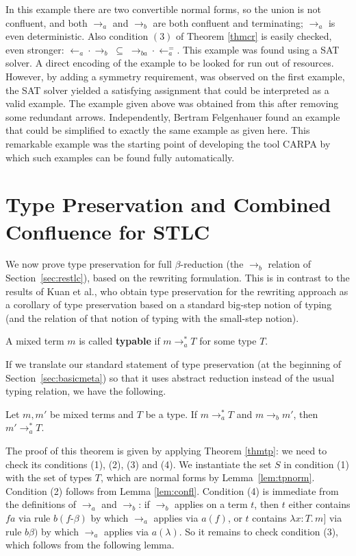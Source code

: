 \documentclass{LMCS}
\newcommand{\subse}{\; \subseteq \;}
\begin{document}
\vspace{4mm}

In this example there are two convertible normal forms, so the union is
not confluent, and both $\to_a$ and $\to_b$ are both confluent and terminating;
$\to_a$ is even deterministic. Also condition $(3)$ of Theorem
\ref{thmcr} is easily checked, even stronger:
$\leftarrow_a \cdot \to_b \subse \to_{ba} \cdot \leftarrow_a^=$.
This example was found using a SAT solver. A direct encoding of the example to be
looked for run out of resources. However, by adding a symmetry requirement, 
was observed on the first example, the SAT solver yielded a satisfying assignment
that could be interpreted as a valid example. The example given
above was obtained from this after removing some redundant arrows.
Independently, Bertram Felgenhauer found an example that could be
simplified to exactly the same example as given here. This remarkable
example was the starting point of developing the tool CARPA by which such
examples can be found fully automatically.

\section{Type Preservation and Combined Confluence for STLC}
\label{sec:presstlc}

We now prove type preservation for full $\beta$-reduction (the $\to_b$
relation of Section~\ref{sec:restlc}), based on the rewriting
formulation.  This is in contrast to the results of Kuan et al., who
obtain type preservation for the rewriting approach as a corollary of
type preservation based on a standard big-step notion of typing (and
the relation of that notion of typing with the small-step notion).  

\begin{defi}[Typability]
A mixed term $m$ is called \textbf{typable} 
if $m\to_a^* T$ for some type $T$.  
\end{defi}

\noindent If we translate our standard statement of type preservation (at the
beginning of Section~\ref{sec:basicmeta}) so that it uses abstract
reduction instead of the usual typing relation, we have the following.

\begin{thm}
\label{thm:presstlc}
Let $m,m'$ be mixed terms and $T$ be a type.
If $m \to_a^* T$ and $m\to_b m'$, then $m'\to_a^* T$.
\end{thm}

\noindent The proof of this theorem is given by applying Theorem
\ref{thmtp}: we need to check its conditions (1), (2), (3) and (4). We
instantiate the set $S$ in condition (1) with the set of types $T$,
which are normal forms by Lemma~\ref{lem:tpnorm}.  Condition (2)
follows from Lemma \ref{lem:confl}. Condition (4) is immediate from
the definitions of $\to_a$ and $\to_b$: if $\to_b$ applies on a
term $t$, then $t$ either contains $f a$ via rule
$\textit{b}(\textit{f-}\beta)$ by which $\to_a$ applies via $a(f)$, or
$t$ contains $\lambda x:T.\, m]$ via rule $\textit{b}\beta)$ by which
  $\to_a$ applies via $a(\lambda)$. So it remains to check condition
  (3), which follows from the following lemma.
\end{document}
